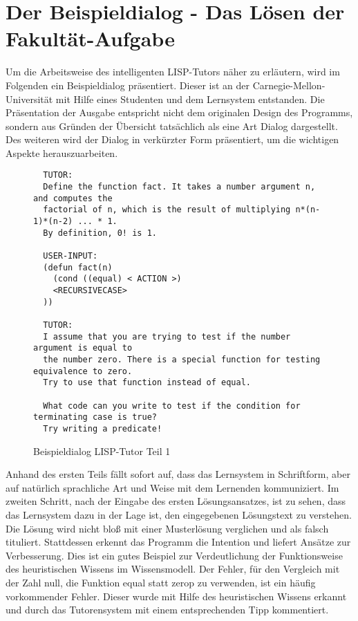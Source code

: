 \section{Der Beispieldialog - Das Lösen der Fakultät-Aufgabe}
Um die Arbeitsweise des intelligenten LISP-Tutors näher zu erläutern,
wird im Folgenden ein Beispieldialog präsentiert. Dieser ist an der
Carnegie-Mellon-Universität mit Hilfe eines Studenten und dem Lernsystem entstanden.
Die Präsentation der Ausgabe entspricht nicht dem originalen Design des Programms,
sondern aus Gründen der Übersicht tatsächlich als eine Art Dialog dargestellt.
Des weiteren wird der Dialog in verkürzter Form präsentiert, um die wichtigen Aspekte
herauszuarbeiten.
\newpage


\begin{figure}[!ht]
\begin{lstlisting}
  TUTOR:
  Define the function fact. It takes a number argument n, and computes the
  factorial of n, which is the result of multiplying n*(n-1)*(n-2) ... * 1.
  By definition, 0! is 1.

  USER-INPUT:
  (defun fact(n)
    (cond ((equal) < ACTION >)
    <RECURSIVECASE>
  ))

  TUTOR:
  I assume that you are trying to test if the number argument is equal to
  the number zero. There is a special function for testing equivalence to zero.
  Try to use that function instead of equal.

  What code can you write to test if the condition for terminating case is true?
  Try writing a predicate!
\end{lstlisting}
\caption{Beispieldialog LISP-Tutor Teil 1}
\end{figure}

Anhand des ersten Teils fällt sofort auf, dass das Lernsystem in Schriftform, aber
auf natürlich sprachliche Art und Weise mit dem Lernenden kommuniziert.
Im zweiten Schritt, nach der Eingabe des ersten Lösungsansatzes, ist zu sehen,
dass das Lernsystem dazu in der Lage ist, den eingegebenen Lösungstext zu verstehen.
Die Lösung wird nicht bloß mit einer Musterlösung verglichen und als falsch tituliert.
Stattdessen erkennt das Programm die Intention und liefert Ansätze zur Verbesserung.
Dies ist ein gutes Beispiel zur Verdeutlichung der Funktionsweise des heuristischen Wissens
im Wissensmodell. Der Fehler, für den Vergleich mit der Zahl null, die Funktion
equal statt zerop zu verwenden, ist ein häufig vorkommender Fehler. Dieser wurde mit Hilfe
des heuristischen Wissens erkannt und durch das Tutorensystem mit einem entsprechenden Tipp
kommentiert.

